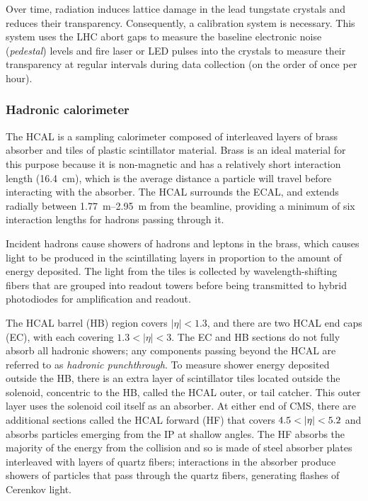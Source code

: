 Over time, radiation induces lattice damage in the lead tungstate crystals and
reduces their transparency. Consequently, a calibration system is necessary.
This system uses the LHC abort gaps to measure the baseline electronic noise
(\textit{pedestal}) levels and fire laser or LED pulses into the crystals to
measure their transparency at regular intervals during data collection (on the
order of once per hour).

\subsubsection{Hadronic calorimeter}
The HCAL is a sampling calorimeter composed of interleaved layers of brass
absorber and tiles of plastic scintillator material. Brass is an ideal material
for this purpose because it is non-magnetic and has a relatively short
interaction length (\SI{16.4}{\centi\meter}), which is the average distance a
particle will travel before interacting with the absorber. The HCAL surrounds
the ECAL, and extends radially between \SIrange{1.77}{2.95}{\meter} from the
beamline, providing a minimum of six interaction lengths for hadrons passing
through it.

Incident hadrons cause showers of hadrons and leptons in the brass, which causes
light to be produced in the scintillating layers in proportion to the amount of
energy deposited. The light from the tiles is collected by wavelength-shifting
fibers that are grouped into readout towers before being transmitted to hybrid
photodiodes for amplification and readout.

The HCAL barrel (HB) region covers $|\eta| < 1.3$, and there are two HCAL end
caps (EC), with each covering $1.3 < |\eta| < 3$. The EC and HB sections do not
fully absorb all hadronic showers; any components passing beyond the HCAL are
referred to as \textit{hadronic punchthrough}. To measure shower energy
deposited outside the HB, there is an extra layer of scintillator tiles located
outside the solenoid, concentric to the HB, called the HCAL outer, or tail
catcher. This outer layer uses the solenoid coil itself as an absorber. At
either end of CMS, there are additional sections called the HCAL forward (HF)
that covers $4.5 < \lvert\eta\rvert < 5.2$ and absorbs particles emerging from the IP
at shallow angles. The HF absorbs the majority of the energy from the collision
and so is made of steel absorber plates interleaved with layers of quartz
fibers; interactions in the absorber produce showers of particles that pass
through the quartz fibers, generating flashes of Cerenkov light.

